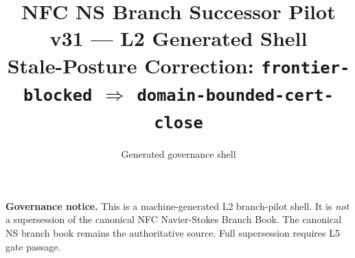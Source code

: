 \documentclass[11pt]{article}
\title{NFC NS Branch Successor Pilot\\[0.5ex]
  \large v31 --- L2 Generated Shell\\[0.5ex]
  \normalsize Stale-Posture Correction: \texttt{frontier-blocked}
  $\Rightarrow$ \texttt{domain-bounded-cert-close}}
\author{Generated governance shell}
\date{}
\begin{document}
\maketitle
\tableofcontents
\bigskip
\noindent\textbf{Governance notice.} This is a machine-generated L2
branch-pilot shell. It is \emph{not} a supersession of the canonical
NFC Navier-Stokes Branch Book. The canonical NS branch book remains
the authoritative source. Full supersession requires L5 gate passage.
\vspace{1em}

\end{document}
